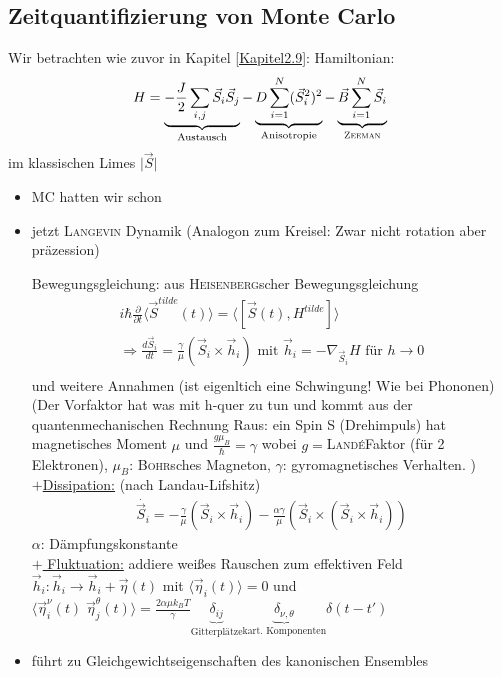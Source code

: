 \documentclass[12pt]{article}
\begin{document}
\subsection{Zeitquantifizierung von Monte Carlo} %
 Wir betrachten wie zuvor in Kapitel  \ref{Kapitel2.9}:
 Hamiltonian: \begin{align}
 H =\underbrace{ -\frac{J}{2} \sum_{i,j} \vec{S}_i \vec{S}_j }_\text{Austausch}- \underbrace{ D \sum_{i=1}^N (\vec{S}_i^2)^2 }_\text{Anisotropie}- \underbrace{\vec{B} \sum_{i=1}^N \vec{S}_i }_\text{\textsc{Zeeman}}
 \end{align}
 im klassischen Limes $\vert \vec{S} \vert $ 
 \begin{itemize}
 \item MC hatten wir schon
 \item jetzt \textsc{Langevin} Dynamik (Analogon zum Kreisel: Zwar nicht rotation aber präzession)
 
  Bewegungsgleichung: aus \textsc{Heisenberg}scher Bewegungsgleichung
  \begin{align}
  i \hbar \frac{\partial}{\partial t} \langle \vec{S}^{tilde}(t) \rangle = \langle \left[ \vec{S}(t) ,H^{tilde}\right] \rangle \\
  \Rightarrow \frac{d \vec{S}_i}{dt} = \frac{\gamma}{\mu } ( \vec{S}_i \times \vec{h}_i ) \mbox{ mit } \vec{h}_i = - \nabla_{\vec{S}_i} H \mbox{ für } h \to 0 \\
  \end{align}
  und weitere Annahmen (ist eigenltich eine Schwingung! Wie bei Phononen) (Der Vorfaktor hat was mit h-quer zu tun und kommt aus der quantenmechanischen Rechnung Raus: ein Spin S (Drehimpuls) hat magnetisches Moment $\mu$ und $\frac{g \mu_B}{\hbar}= \gamma$ wobei $g=$\textsc{Landé}Faktor (für 2 Elektronen), $\mu_B$: \textsc{Bohr}sches Magneton, $\gamma$: gyromagnetisches Verhalten. ) \\
  
  \underline{$+$Dissipation:} (nach Landau-Lifshitz)
  \begin{align}
  \dot{\vec{S}_i}= -\frac{\gamma}{\mu} (\vec{S}_i \times \vec{h}_i ) - \frac{\alpha \gamma}{\mu} (\vec{S}_i \times ( \vec{S}_i \times \vec{h}_i))
  \end{align}
  $\alpha$: Dämpfungskonstante \\
  \underline{$+$ Fluktuation:} addiere weißes Rauschen zum effektiven Feld $\vec{h}_i: \vec{h}_i \to \vec{h}_i + \vec{\eta} (t)$
  mit $\langle \vec{\eta}_i (t) \rangle = 0$ und
   $\langle  \vec{\eta}_i^\nu (t)  \;  \vec{\eta}_j ^\theta (t) \rangle = \frac{2 \alpha \mu k_B T}{\gamma} \underbrace{\delta_{ij}}_\text{Gitterplätze} \underbrace{\delta_{\nu, \theta}}_\text{kart. Komponenten} \delta (t- t')$
   \item führt zu Gleichgewichtseigenschaften des kanonischen Ensembles
   \end{itemize}
\end{document}
